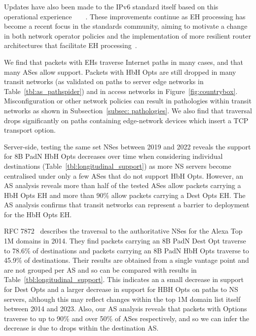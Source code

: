 \documentclass[conference]{IEEEtran}
\begin{document}
Updates have also been made to the IPv6 standard itself based on this
operational experience~\cite{RFC5722}~\cite{RFC6734}~\cite{RFC6564}~\cite{RFC8200}. These improvements continue as EH processing has become a recent focus in the standards community, aiming to motivate a change in both network operator policies and the implementation of more resilient router architectures that facilitate EH processing~\cite{ietf-6man-hbh-processing-06, ietf-v6ops-hbh-03, ietf-6man-eh-limits-02}. 


We find that packets with EHs traverse Internet paths in many cases, and that many ASes allow support.
Packets with HbH Opts are still dropped in many transit networks (as validated on paths to server edge networks in Table~\ref{tbl:as_pathspider}) and in access networks in Figure~\ref{fig:countrybox}. Misconfiguration or other network policies can result in pathologies within transit networks as shown in Subsection~\ref{subsec: pathologies}. We also find that traversal drops significantly on paths containing edge-network devices which insert a TCP transport option.

Server-side, testing the same set NSes between 2019 and 2022 reveals the support for 8B PadN HbH Opts decreases over time when considering individual destinations (Table~\ref{tbl:longitudinal_support}) as more NS servers become centralised under only a few ASes that do not support HbH Opts.  However, an AS analysis reveals more than half of the tested ASes allow packets carrying a HbH Opts EH and more than 90\% allow packets carrying a Dest Opts EH. The AS analysis confirms that transit networks can represent a barrier to deployment for the HbH Opts EH.
 
RFC 7872~\cite{RFC7872} describes the traversal to the authoritative NSes for the Alexa Top 1M domains in 2014. They find packets carrying an 8B PadN Dest Opt traverse to 78.6\% of destinations and packets carrying an 8B PadN HbH Opts traverse to 45.9\% of destinations. Their results are obtained from a single vantage point and are not grouped per AS and so can be compared with results in Table~\ref{tbl:longitudinal_support}.
This indicates an a small decrease in support for Dest Opts and a larger decrease in support for HBH Opts on paths to NS servers, although this may reflect changes within the top 1M domain list itself between 2014 and 2023.
Also, our AS analysis reveals that packets with Options traverse to up to 90\% and over 50\% of ASes respectively, and so we can infer the decrease is due to drops within the destination AS.
\end{document}
